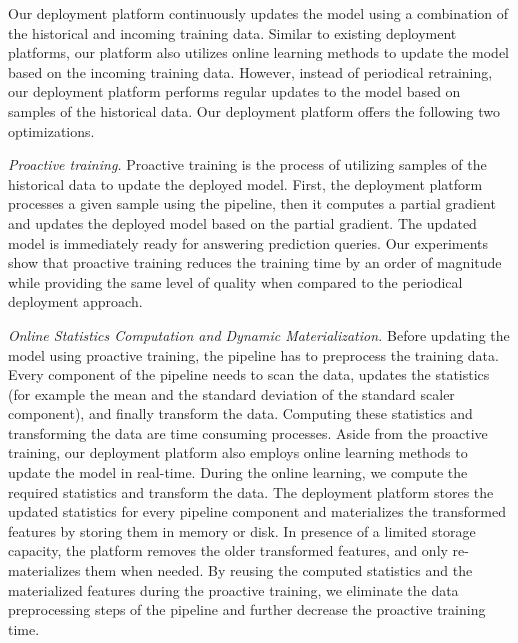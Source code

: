 
Our deployment platform continuously updates the model using a combination of the historical and incoming training data.
Similar to existing deployment platforms, our platform also utilizes online learning methods to update the model based on the incoming training data.
However, instead of periodical retraining, our deployment platform performs regular updates to the model based on samples of the historical data.
Our deployment platform offers the following two optimizations.

\textit{Proactive training.}
Proactive training is the process of utilizing samples of the historical data to update the deployed model.
First, the deployment platform processes a given sample using the pipeline, then it computes a partial gradient and updates the deployed model based on the partial gradient.
The updated model is immediately ready for answering prediction queries.
Our experiments show that proactive training reduces the training time by an order of magnitude while providing the same level of quality when compared to the periodical deployment approach.

\textit{Online Statistics Computation and Dynamic Materialization.}
Before updating the model using proactive training, the pipeline has to preprocess the training data.
Every component of the pipeline needs to scan the data, updates the statistics (for example the mean and the standard deviation of the standard scaler component), and finally transform the data.
Computing these statistics and transforming the data are time consuming processes.
Aside from the proactive training, our deployment platform also employs online learning methods to update the model in real-time.
During the online learning, we compute the required statistics and transform the data.
The deployment platform stores the updated statistics for every pipeline component and materializes the transformed features by storing them in memory or disk.
In presence of a limited storage capacity, the platform removes the older transformed features, and only re-materializes them when needed.
By reusing the computed statistics and the materialized features during the proactive training, we eliminate the data preprocessing steps of the pipeline and further decrease the proactive training time.

